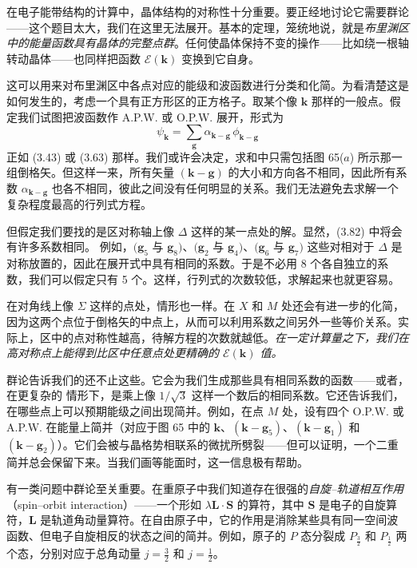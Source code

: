 在电子能带结构的计算中，晶体结构的对称性十分重要。要正经地讨论它需要群论——这个题目太大，我们在这里无法展开。基本的定理，笼统地说，就是\emph{布里渊区中的能量函数具有晶体的完整点群}。任何使晶体保持不变的操作——比如绕一根轴转动晶体——也同样把函数 $\mathcal{E}(\mathbf{k})$ 变换到它自身。

这可以用来对布里渊区中各点对应的能级和波函数进行分类和化简。为看清楚这是如何发生的，考虑一个具有正方形区的正方格子。取某个像 $\mathbf{k}$ 那样的一般点。假定我们试图把波函数作 A.P.W. 或 O.P.W. 展开，形式为
\begin{equation*}
\psi_{\mathbf{k}}=\sum_{\mathbf{g}}\alpha_{\mathbf{k}-\mathbf{g}}\,\phi_{\mathbf{k}-\mathbf{g}}\tag{3.82}
\end{equation*}
正如 (3.43) 或 (3.63) 那样。我们或许会决定，求和中只需包括图 65($a$) 所示那一组倒格矢。但这样一来，所有矢量 $(\mathbf{k}-\mathbf{g})$ 的大小和方向各不相同，因此所有系数 $\alpha_{\mathbf{k}-\mathbf{g}}$ 也各不相同，彼此之间没有任何明显的关系。我们无法避免去求解一个复杂程度最高的行列式方程。

但假定我们要找的是区对称轴上像 $\Delta$ 这样的某一点处的解。显然，(3.82) 中将会有许多系数相同。
例如，$(\mathbf{g}_5$ 与 $\mathbf{g}_8)$、$(\mathbf{g}_2$ 与 $\mathbf{g}_4)$、$(\mathbf{g}_6$ 与 $\mathbf{g}_7)$ 这些对相对于 $\Delta$ 是对称放置的，因此在展开式中具有相同的系数。于是不必用 8 个各自独立的系数，我们可以假定只有 5 个。这样，行列式的次数较低，求解起来也就更容易。

在对角线上像 $\Sigma$ 这样的点处，情形也一样。在 $X$ 和 $M$ 处还会有进一步的化简，因为这两个点位于倒格矢的中点上，从而可以利用系数之间另外一些等价关系。实际上，区中的点对称性越高，待解方程的次数就越低。\emph{在一定计算量之下，我们在高对称点上能得到比区中任意点处更精确的 $\mathcal{E}(\mathbf{k})$ 值。}

群论告诉我们的还不止这些。它会为我们生成那些具有相同系数的函数——或者，在更复杂的
情形下，是乘上像 $1/\sqrt{3}$ 这样一个数后的相同系数。它还告诉我们，在哪些点上可以预期能级之间出现简并。例如，在点 $M$ 处，设有四个 O.P.W. 或 A.P.W. 在能量上简并（对应于图 65 中的 $\mathbf{k}$、$(\mathbf{k}-\mathbf{g}_5)$、$(\mathbf{k}-\mathbf{g}_1)$ 和 $(\mathbf{k}-\mathbf{g}_2)$）。它们会被与晶格势相联系的微扰所劈裂——但可以证明，一个二重简并总会保留下来。当我们画等能面时，这一信息极有帮助。

有一类问题中群论至关重要。在重原子中我们知道存在很强的\emph{自旋–轨道相互作用}（spin–orbit interaction）——一个形如 $\lambda\mathbf{L}\cdot\mathbf{S}$ 的算符，其中 $\mathbf{S}$ 是电子的自旋算符，$\mathbf{L}$ 是轨道角动量算符。在自由原子中，它的作用是消除某些具有同一空间波函数、但电子自旋相反的状态之间的简并。例如，原子的 $P$ 态分裂成 $P_{\frac{3}{2}}$ 和 $P_{\frac{1}{2}}$ 两个态，分别对应于总角动量 $j=\frac{3}{2}$ 和 $j=\frac{1}{2}$。

